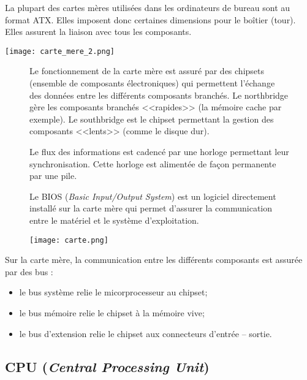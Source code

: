 La plupart des cartes mères utilisées dans les ordinateurs de bureau sont au format ATX. Elles imposent donc certaines dimensions pour le boîtier (tour). Elles assurent la liaison avec tous les composants.

\begin{center}
\texttt{[image: carte\_mere\_2.png]}
\end{center}




\begin{figure}[h]
\begin{minipage}[c]{.49\linewidth}

Le fonctionnement de la carte mère est assuré par des chipsets (ensemble de composants électroniques) qui permettent l'échange des données entre les différents composants branchés. Le northbridge gère les composants branchés <<rapides>> (la mémoire cache par exemple). Le southbridge est le chipset permettant la gestion des composants <<lents>> (comme le disque dur). 

Le flux des informations est cadencé par une horloge permettant leur synchronisation. Cette horloge est alimentée de façon permanente par une pile. 

Le BIOS (\textit{Basic Input/Output System}) est un logiciel directement installé sur la carte mère qui permet d'assurer la communication entre le matériel et le système d'exploitation. 

\end{minipage} \hfill
\begin{minipage}[c]{.49\linewidth}
\begin{center}
\texttt{[image: carte.png]}
\label{}
\end{center}
\end{minipage}
\end{figure}

Sur la carte mère, la communication entre les différents composants est assurée par des bus :
\begin{itemize}
\item le bus système relie le micorprocesseur au chipset;
\item le bus mémoire relie le chipset à la mémoire vive;
\item le bus d'extension relie le chipset aux connecteurs d'entrée -- sortie.
\end{itemize}

\subsection{CPU (\textit{Central Processing Unit})}


